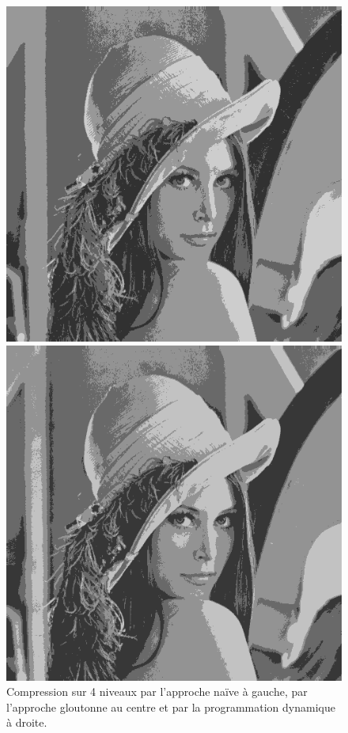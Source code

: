 \documentclass[a4paper, 12pt]{article}
\begin{document}
\begin{figure}[ht!]
\begin{minipage}[b]{0.3\linewidth}
    	    \includegraphics[scale=0.3]{resources/png/greedy4.png}
        \end{minipage}\hfill
        \begin{minipage}[b]{0.3\linewidth}
    	    \includegraphics[scale=0.3]{resources/png/dp4.png}
        \end{minipage}
        \caption{Compression sur 4 niveaux par l'approche naïve à gauche, par l'approche gloutonne au centre et par la programmation dynamique à droite.}
    \end{figure}
    
\end{document}
